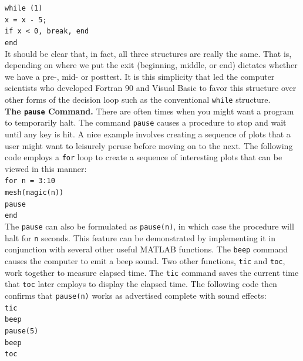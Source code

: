 \documentclass[../main.tex]{subfiles}
\begin{document}
\texttt{while (1)\\
\indent\hspace{2mm} x = x - 5;\\
\indent\hspace{2mm} if x < 0, break, end\\
\indent end}\\

It should be clear that, in fact, all three structures are really the same. That is, depending
on where we put the exit (beginning, middle, or end) dictates whether we have a pre-,
mid- or posttest. It is this simplicity that led the computer scientists who developed
Fortran 90 and Visual Basic to favor this structure over other forms of the decision loop
such as the conventional \texttt{while} structure.\\

\noindent\textbf{The \texttt{pause} Command.} There are often times when you might want a program to temporarily
halt. The command \texttt{pause} causes a procedure to stop and wait until any key is hit.
A nice example involves creating a sequence of plots that a user might want to leisurely
peruse before moving on to the next. The following code employs a \texttt{for} loop to create a
sequence of interesting plots that can be viewed in this manner:\\

\texttt{for n = 3:10\\
\indent\hspace{2mm} mesh(magic(n))\\
\indent\hspace{2mm} pause\\
\indent end}\\

The \texttt{pause} can also be formulated as \texttt{pause(n)}, in which case the procedure will halt
for \texttt{n} seconds. This feature can be demonstrated by implementing it in conjunction with
several other useful MATLAB functions. The \texttt{beep} command causes the computer to emit
a beep sound. Two other functions, \texttt{tic} and \texttt{toc}, work together to measure elapsed time.
The \texttt{tic} command saves the current time that \texttt{toc} later employs to display the elapsed
time. The following code then confirms that \texttt{pause(n)} works as advertised complete with
sound effects:\\

\texttt{tic\\
\indent beep\\
\indent pause(5)\\
\indent beep\\
\indent toc}\\
\end{document}
